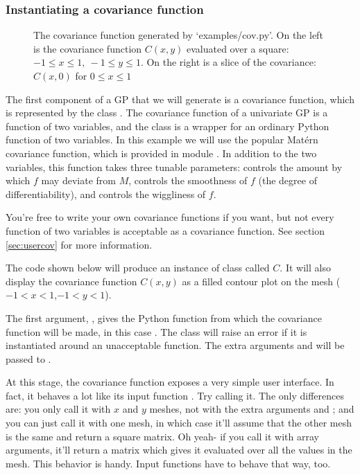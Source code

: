 \documentclass{manual}
\begin{document}
\subsubsection{Instantiating a covariance function}\label{subsub:cov}
\begin{figure}
	\centering
	\caption{The covariance function generated by {\sffamily `examples/cov.py'}. On the left is the covariance function $C(x,y)$ evaluated over a square: $-1\le x\le 1,\ -1\le y\le 1$. On the right is a slice of the covariance: $C(x,0)$ for $0\le x \le 1$}
	\label{fig:cov}
\end{figure}

The first component of a GP that we will generate is a covariance function, which is represented by the class . The covariance function of a univariate GP is a function of two variables, and the  class is a wrapper for an ordinary Python function of two variables. In this example we will use the popular Mat\'ern covariance function, which is provided in module . In addition to the two variables, this function takes three tunable parameters:  controls the amount by which $f$ may deviate from $M$,  controls the smoothness of $f$ (the degree of differentiability), and  controls the wiggliness of $f$.

You're free to write your own covariance functions if you want, but not every function of two variables is acceptable as a covariance function. See section \ref{sec:usercov} for more information.

The code shown below will produce an instance of class  called $C$. It will also display the covariance function $C(x,y)$ as a filled contour plot on the mesh ($-1<x<1$,$-1<y<1$).


The first argument, , gives the Python function from which the covariance function will be made, in this case . The  class will raise an error if it is instantiated around an unacceptable function. The extra arguments  and  will be passed to .

At this stage, the covariance function exposes a very simple user interface. In fact, it behaves a lot like its input function . Try calling it. The only differences are: you only call it with $x$ and $y$ meshes, not with the extra arguments  and ; and you can just call it with one mesh, in which case it'll assume that the other mesh is the same and return a square matrix. Oh yeah- if you call it with array arguments, it'll return a matrix which gives it evaluated over all the values in the mesh. This behavior is handy. Input functions have to behave that way, too.
\end{document}
